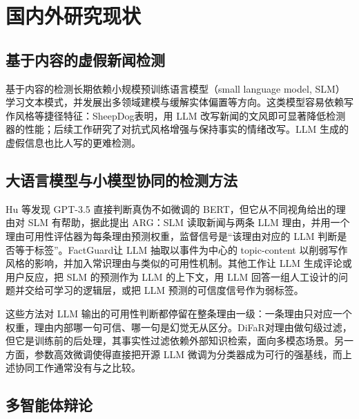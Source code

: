 \section{国内外研究现状}\label{sec:intro-related}

\subsection{基于内容的虚假新闻检测}

基于内容的检测长期依赖小规模预训练语言模型（small language model, SLM）学习文本模式\citep{shu2017fake,devlin2019bert}，并发展出多领域建模\citep{nan2021mdfend,zhu2023m3fend}与缓解实体偏置\citep{zhu2022endef}等方向。这类模型容易依赖写作风格等捷径特征\citep{geirhos2020shortcut}：SheepDog\citep{wu2024sheepdog}表明，用 LLM 改写新闻的文风即可显著降低检测器的性能；后续工作研究了对抗式风格增强\citep{park2024adstyle}与保持事实的情绪改写\citep{guo2026emotion}。LLM 生成的虚假信息也比人写的更难检测\citep{chen2024can,chen2024combating}。

\subsection{大语言模型与小模型协同的检测方法}

Hu 等\citep{hu2024bad}发现 GPT-3.5 直接判断真伪不如微调的 BERT，但它从不同视角给出的理由对 SLM 有帮助，据此提出 ARG：SLM 读取新闻与两条 LLM 理由，并用一个理由可用性评估器为每条理由预测权重，监督信号是“该理由对应的 LLM 判断是否等于标签”。FactGuard\citep{he2026factguard}让 LLM 抽取以事件为中心的 topic-content 以削弱写作风格的影响，并加入常识理由与类似的可用性机制。其他工作让 LLM 生成评论或用户反应\citep{nan2024genfend,wan2024dell}，把 SLM 的预测作为 LLM 的上下文\citep{xu2024supericl}，用 LLM 回答一组人工设计的问题并交给可学习的逻辑层\citep{liu2024teller}，或把 LLM 预测的可信度信号作为弱标签\citep{leite2023pastel}。

这些方法对 LLM 输出的可用性判断都停留在整条理由一级：一条理由只对应一个权重，理由内部哪一句可信、哪一句是幻觉无从区分。DiFaR\citep{wan2025difar}对理由做句级过滤，但它是训练前的后处理，其事实性过滤依赖外部知识检索，面向多模态场景。另一方面，参数高效微调\citep{hu2022lora}使得直接把开源 LLM 微调为分类器成为可行的强基线\citep{raza2024comparative}，而上述协同工作通常没有与之比较。

\subsection{多智能体辩论}

